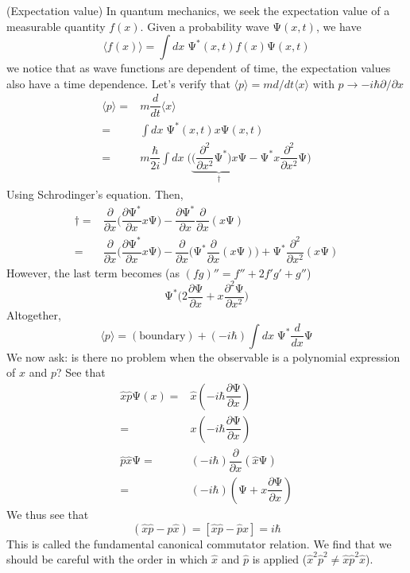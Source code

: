 \begin{rmk}
(Expectation value) In quantum mechanics, we seek the expectation value of a measurable quantity $f(x)$. Given a probability wave $\mathrm{\Psi} (x,t)$, we have
\[\langle f(x)\rangle =\int dx\;\mathrm{\Psi} ^{*}(x,t)f(x)\mathrm{\Psi} (x,t)\]
we notice that as wave functions are dependent of time, the expectation values also have a time dependence. Let's verify that $\langle p\rangle =m d/dt\langle x\rangle $ with $p\rightarrow -i\hbar \partial /\partial x$
\begin{align*}
	\langle p\rangle =&m\dfrac{d }{d t}\langle x\rangle \\
	=&\int dx\;\mathrm{\Psi} ^{*}(x,t)x\mathrm{\Psi}(x,t)\\
	=&m\dfrac{\hbar }{2i}\int dx\;\Big(\underbrace{\Big(\dfrac{\partial ^2}{\partial x^2}\mathrm{\Psi} ^{*} \Big)x\mathrm{\Psi}}_{\dagger} -\mathrm{\Psi} ^{*}x\dfrac{\partial ^2}{\partial x^2}\mathrm{\Psi}  \Big)	
\end{align*}
Using Schrodinger's equation. Then,
\begin{align*}
	\dagger=&\dfrac{\partial }{\partial x}\Big(\dfrac{\partial \mathrm{\Psi} ^{*}}{\partial x}x\mathrm{\Psi}  \Big)-\dfrac{\partial \mathrm{\Psi} ^{*}}{\partial x}\dfrac{\partial }{\partial x}(x\mathrm{\Psi} )\\
=&\dfrac{\partial }{\partial x}\Big(\dfrac{\partial \mathrm{\Psi} ^{*}}{\partial x}x\mathrm{\Psi}  \Big)-\dfrac{\partial }{\partial x}\Big(\mathrm{\Psi} ^{*}\dfrac{\partial }{\partial x}(x\mathrm{\Psi} ) \Big)+\mathrm{\Psi} ^{*}\dfrac{\partial ^2}{\partial x^2}(x\mathrm{\Psi} )  
\end{align*}
However, the last term becomes (as $(fg)''=f''+2f'g'+g''$)
\[\mathrm{\Psi} ^{*}\Big(2\dfrac{\partial \mathrm{\Psi} }{\partial x}+x\dfrac{\partial ^2\mathrm{\Psi} }{\partial x^2}\Big)\]
Altogether,
\[\langle p\rangle =\mathrm{(boundary)}+(-i\hbar )\int dx\;\mathrm{\Psi} ^{*}\dfrac{d }{d x}\mathrm{\Psi}  \]
We now ask: is there no problem when the observable is a polynomial expression of $x$ and $p$? See that
\begin{align*}
	\hat{x}\hat{p}\mathrm{\Psi} (x)=&\hat{x}(-i\hbar \dfrac{\partial \mathrm{\Psi} }{\partial x} )\\
=&x(-i\hbar \dfrac{\partial \mathrm{\Psi} }{\partial x} )\\
\hat{p}\hat{x}\mathrm{\Psi}=&(-i\hbar )\dfrac{\partial }{\partial x}(\hat{x}\mathrm{\Psi} )\\
=&(-i\hbar )(\mathrm{\Psi} +x\dfrac{\partial \mathrm{\Psi} }{\partial x} )
\end{align*}
We thus see that
\[(\hat{x}\hat{p}-\hat{p}\hat{x})=[\hat{x}\hat{p}-\hat{p}\hat{x}]=i\hbar \]
This is called the fundamental canonical commutator relation. We find that we should be careful with the order in which $\hat{x}$ and $\hat{p}$ is applied ($\hat{x}^2\hat{p}^2\ne \hat{x}\hat{p}^2\hat{x}$).
\end{rmk}
